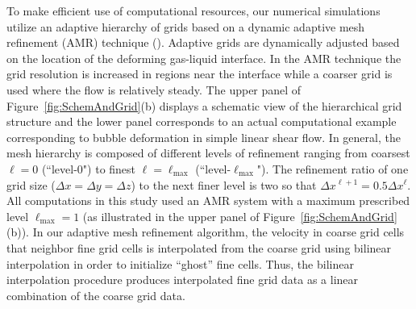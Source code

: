 \documentclass{elsarticle}
\begin{document}
To make efficient use of computational resources, our numerical simulations
utilize an adaptive hierarchy of grids based on a dynamic adaptive mesh
refinement (AMR) technique (\citet{SusAlmBelColHowWel99}).  Adaptive grids are
dynamically adjusted based on the location of the 
deforming gas-liquid interface.
In the AMR technique the grid resolution is increased in regions near the
interface while a coarser grid is used where the flow is relatively steady.
The upper panel of Figure~\ref{fig:SchemAndGrid}(b) displays a schematic view
of the hierarchical grid structure and the lower panel corresponds to an actual
computational example corresponding to bubble deformation in simple linear shear flow.  In
general, the mesh hierarchy is composed of different levels of refinement
ranging from coarsest $\ell=0$ (``level-0") to finest
$\ell=\ell_{\textrm{max}}$ (``level-$\ell_{\textrm{max}}$").  The refinement
ratio of one grid size ($\Delta x=\Delta y=\Delta z$) to the next finer level
is two so that $\Delta x^{\ell+1}=0.5\Delta x^{\ell}$.  All computations in
this study used an AMR system with a maximum prescribed level
$\ell_{\textrm{max}} = 1$ (as illustrated in the upper panel of
Figure~\ref{fig:SchemAndGrid}(b)).  In our adaptive mesh refinement algorithm,
the velocity in coarse grid cells that neighbor fine grid cells is interpolated
from the coarse grid using bilinear interpolation in order to initialize
``ghost'' fine cells. Thus, the bilinear interpolation procedure produces
interpolated fine grid data as a linear combination of the coarse grid data. 
\end{document}
